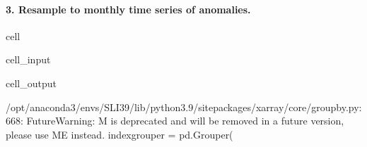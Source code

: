\documentclass[letterpaper,10pt,english]{jupyterBook}
\begin{document}
\paragraph{3. Resample to monthly time series of anomalies.}
\label{\detokenize{notebooks/regional_and_local/SL_anomaly_annual:resample-to-monthly-time-series-of-anomalies}}
\begin{sphinxuseclass}{cell}\begin{sphinxVerbatimInput}

\begin{sphinxuseclass}{cell_input}
\begin{sphinxVerbatim}[commandchars=\\\{\}]
  

  

    

\end{sphinxVerbatim}

\end{sphinxuseclass}\end{sphinxVerbatimInput}
\begin{sphinxVerbatimOutput}

\begin{sphinxuseclass}{cell_output}
\begin{sphinxVerbatim}[commandchars=\\\{\}]
/opt/anaconda3/envs/SLI39/lib/python3.9/site\PYGZhy{}packages/xarray/core/groupby.py:668: FutureWarning: \PYGZsq{}M\PYGZsq{} is deprecated and will be removed in a future version, please use \PYGZsq{}ME\PYGZsq{} instead.
  index\PYGZus{}grouper = pd.Grouper(
\end{sphinxVerbatim}


\end{sphinxuseclass}
\end{sphinxVerbatimOutput}
\end{sphinxuseclass}
\end{document}
